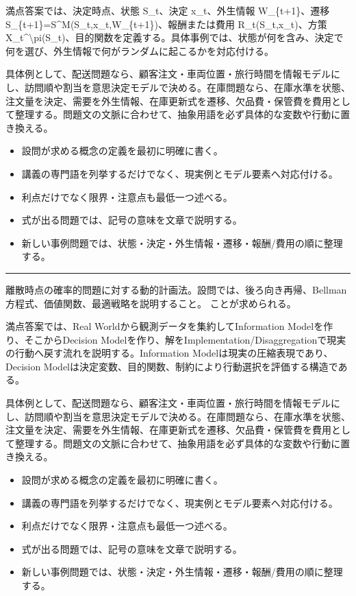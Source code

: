 満点答案では、決定時点、状態 S\_t、決定 x\_t、外生情報 W\_\{t+1\}、遷移 S\_\{t+1\}=S\textasciicircum{}M(S\_t,x\_t,W\_\{t+1\})、報酬または費用 R\_t(S\_t,x\_t)、方策 X\_t\textasciicircum{}\textbackslash{}pi(S\_t)、目的関数を定義する。具体事例では、状態が何を含み、決定で何を選び、外生情報で何がランダムに起こるかを対応付ける。\par
{}
具体例として、配送問題なら、顧客注文・車両位置・旅行時間を情報モデルにし、訪問順や割当を意思決定モデルで決める。在庫問題なら、在庫水準を状態、注文量を決定、需要を外生情報、在庫更新式を遷移、欠品費・保管費を費用として整理する。問題文の文脈に合わせて、抽象用語を必ず具体的な変数や行動に置き換える。\par
{}
\begin{itemize}
\item 設問が求める概念の定義を最初に明確に書く。
\item 講義の専門語を列挙するだけでなく、現実例とモデル要素へ対応付ける。
\item 利点だけでなく限界・注意点も最低一つ述べる。
\item 式が出る問題では、記号の意味を文章で説明する。
\item 新しい事例問題では、状態・決定・外生情報・遷移・報酬/費用の順に整理する。
\end{itemize}
\vspace{2mm}\hrule\vspace{2mm}
離散時点の確率的問題に対する動的計画法。設問では、後ろ向き再帰、Bellman方程式、価値関数、最適戦略を説明すること。 ことが求められる。\par
{}
満点答案では、Real Worldから観測データを集約してInformation Modelを作り、そこからDecision Modelを作り、解をImplementation/Disaggregationで現実の行動へ戻す流れを説明する。Information Modelは現実の圧縮表現であり、Decision Modelは決定変数、目的関数、制約により行動選択を評価する構造である。\par
{}
具体例として、配送問題なら、顧客注文・車両位置・旅行時間を情報モデルにし、訪問順や割当を意思決定モデルで決める。在庫問題なら、在庫水準を状態、注文量を決定、需要を外生情報、在庫更新式を遷移、欠品費・保管費を費用として整理する。問題文の文脈に合わせて、抽象用語を必ず具体的な変数や行動に置き換える。\par
{}
\begin{itemize}
\item 設問が求める概念の定義を最初に明確に書く。
\item 講義の専門語を列挙するだけでなく、現実例とモデル要素へ対応付ける。
\item 利点だけでなく限界・注意点も最低一つ述べる。
\item 式が出る問題では、記号の意味を文章で説明する。
\item 新しい事例問題では、状態・決定・外生情報・遷移・報酬/費用の順に整理する。
\end{itemize}
